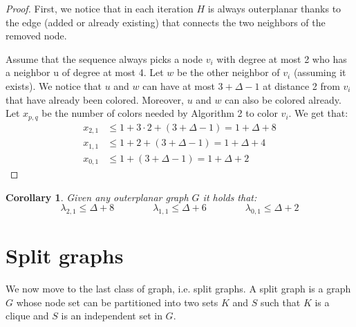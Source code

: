 \documentclass[12pt,a4paper]{article}
\newtheorem{corollary}{Corollary}
\begin{document}
	\begin{proof}
		First, we notice that in each iteration $H$ is always outerplanar thanks to the edge (added or already existing) that connects the two neighbors of the removed node.

		Assume that the sequence always picks a node $v_i$ with degree at most 2 who has a neighbor u of degree at most 4. Let $w$ be the other neighbor of $v_i$ (assuming it exists). We notice that $u$ and $w$ can have at most $3 + \Delta - 1$ at distance 2 from $v_i$ that have already been colored. Moreover, $u$ and $w$ can also be colored already. Let $x_{p,q}$ be the number of colors needed by Algorithm 2 to color $v_i$. We get that:
		\[\begin{split}
			x_{2,1} &\leq 1 + 3 \cdot 2 + (3+\Delta -1) = 1 + \Delta + 8 \\
			x_{1,1} &\leq 1 + 2 + (3+\Delta -1) = 1 + \Delta + 4 \\
			x_{0,1} &\leq 1 + (3+\Delta -1) = 1 + \Delta + 2
		\end{split}\]
	\end{proof}

	\begin{corollary}
		Given any outerplanar graph $G$ it holds that:
    	\[\lambda_{2,1} \leq \Delta+8 \qquad\qquad \lambda_{1,1} \leq \Delta+6 \qquad\qquad \lambda_{0,1} \leq \Delta+2\]
	\end{corollary}

	\section{Split graphs}

	We now move to the last class of graph, i.e. split graphs. A split graph is a graph $G$ whose node set can be partitioned into two sets $K$ and $S$ such that $K$ is a clique and $S$ is an independent set in $G$.
\end{document}
